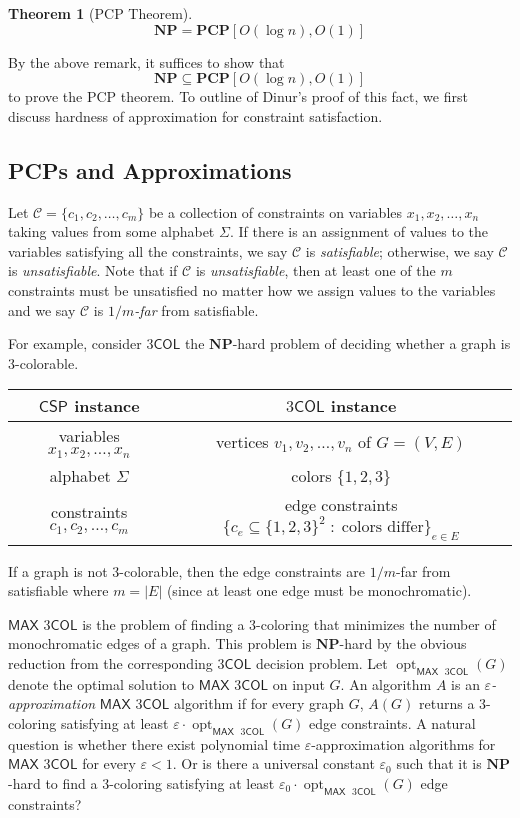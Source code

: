 \documentclass{article}
\newtheorem{theorem}{Theorem}
\newcommand{\class}[1]{\mathbf{#1}}
\newcommand{\NP}{\class{NP}}
\newcommand{\PCP}{\class{PCP}}
\newcommand{\CSP}{\mathsf{CSP}}
\newcommand{\COL}{\mathsf{COL}}
\newcommand{\MAX}{\mathsf{MAX}}
\newcommand{\opt}{{\operatorname{opt}}}
\begin{document}
\begin{theorem}[PCP Theorem]\label{pcp}
$$
\NP = \PCP[O(\log n), O(1)]
$$
\end{theorem}

By the above remark, it suffices to show that
$$
\NP \subseteq \PCP[O(\log n), O(1)]
$$
to prove the PCP theorem.
To outline of Dinur's proof of this fact, we first
discuss hardness of approximation for constraint satisfaction.

\subsection{PCPs and Approximations}


Let $\mathcal{C} = \{c_1, c_2, \dots, c_m\}$ be a collection of constraints on
variables $x_1, x_2, \dots, x_n$ taking values from some alphabet $\Sigma$.
If there is an assignment of values to the variables satisfying all the
constraints, we say $\mathcal{C}$ is \emph{satisfiable}; otherwise, we say
$\mathcal{C}$ is \emph{unsatisfiable}.
Note that if $\mathcal{C}$ is \emph{unsatisfiable}, then at least one of the
$m$ constraints must be unsatisfied no matter how we assign values to the
variables and we say $\mathcal{C}$ is \emph{$1/m$-far} from satisfiable. 

For example, consider $3\COL$ the $\NP$-hard problem of deciding whether a graph is 3-colorable.
\begin{center}
\begin{tabular}{c @{$\quad\longleftrightarrow\quad$} c}
$\CSP$ instance & $3\COL$ instance\\
\hline
variables $x_1, x_2, \dots, x_n$ & vertices $v_1, v_2, \dots, v_n$ of $G = (V, E)$\\
alphabet $\Sigma$ & colors $\{1, 2, 3\}$ \\
constraints $c_1, c_2, \dots, c_m$ & edge constraints $\{c_e \subseteq \{1, 2, 3\}^2 \;:\;\text{colors differ}\}_{e \in E}$\\
\end{tabular}
\end{center}
If a graph is not 3-colorable, then the edge constraints are $1/m$-far from satisfiable
where $m=|E|$ (since at least one edge must be monochromatic).

$\MAX$ $3\COL$ is the problem of finding a 3-coloring that minimizes the
number of monochromatic edges of a graph.
This problem is $\NP$-hard by the obvious reduction from the corresponding
$3\COL$ decision problem.
Let $\opt_{\MAX\text{ }3\COL}(G)$ denote the optimal solution to $\MAX$ $3\COL$
on input $G$.
An algorithm $A$ is an \emph{$\varepsilon$-approximation} $\MAX$ $3\COL$ algorithm
if for every graph $G$, $A(G)$ returns a 3-coloring
satisfying at least $\varepsilon \cdot \opt_{\MAX\text{ }3\COL}(G)$
edge constraints.
A natural question is whether there exist polynomial time $\varepsilon$-approximation
algorithms for $\MAX$ $3\COL$ for every $\varepsilon<1$.
Or is there a universal constant $\varepsilon_0$ such that it is
$\NP$-hard to find a 3-coloring satisfying at least $\varepsilon_0 \cdot \opt_{\MAX\text{ }3\COL}(G)$
edge constraints?
\end{document}
